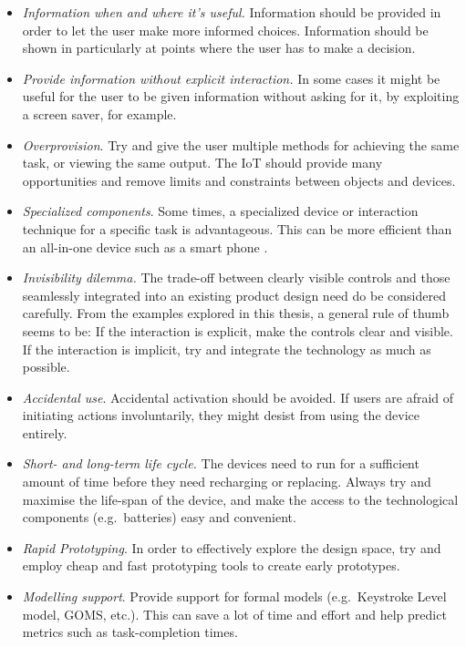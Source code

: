 \begin{itemize}
	\item \emph{Information when and where it's useful.} Information should be provided in order to let the user make more informed choices. Information should be shown in particularly at points where the user has to make a decision.
	\item \emph{Provide information without explicit interaction.} In some cases it might be useful for the user to be given information without asking for it, by exploiting a screen saver, for example.
	\item \emph{Overprovision}. Try and give the user multiple methods for achieving the same task, or viewing the same output. The IoT should provide many opportunities and remove limits and constraints between objects and devices.
	\item \emph{Specialized components}. Some times, a specialized device or interaction technique for a specific task is advantageous. This can be more efficient than an all-in-one device such as a smart phone \cite{corsten13,kranz10}.
	\item \emph{Invisibility dilemma.} The trade-off between clearly visible controls and those seamlessly integrated into an existing product design need do be considered carefully. From the examples explored in this thesis, a general rule of thumb seems to be: If the interaction is explicit, make the controls clear and visible. If the interaction is implicit, try and integrate the technology as much as possible.
	\item \emph{Accidental use}. Accidental activation should be avoided. If users are afraid of initiating actions involuntarily, they might desist from using the device entirely.
	\item \emph{Short- and long-term life cycle.} The devices need to run for a sufficient amount of time before they need recharging or replacing. Always try and maximise the life-span of the device, and make the access to the technological components (e.g.\ batteries) easy and convenient.
	\item \emph{Rapid Prototyping}. In order to effectively explore the design space, try and employ cheap and fast prototyping tools to create early prototypes.
	\item \emph{Modelling support}. Provide support for formal models (e.g.\ Keystroke Level model, GOMS, etc.). This can save a lot of time and effort and help predict metrics such as task-completion times.
\end{itemize}

